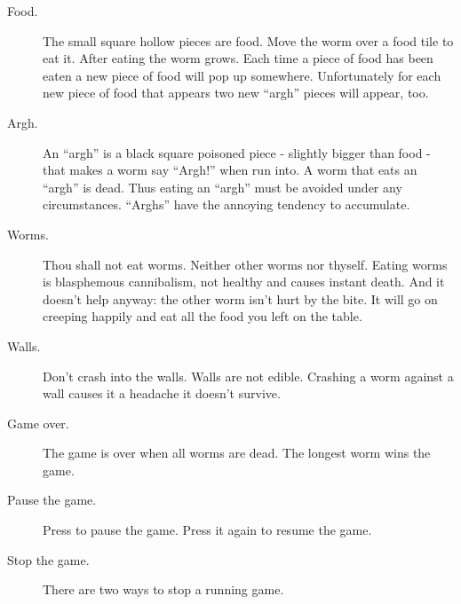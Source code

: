 \begin{description}
\item[Food.]
The small square hollow pieces are food. Move the worm over a food tile
to eat it. After eating the worm grows. Each time a piece of food has
been eaten a new piece of food will pop up somewhere. Unfortunately for
each new piece of food that appears two new ``argh'' pieces will
appear, too.
\item[Argh.]
An ``argh'' is a black square poisoned piece {}- slightly bigger than
food {}- that makes a worm say ``Argh!'' when
run into.  A worm that eats an ``argh'' is dead. Thus eating an
``argh'' must be avoided under any circumstances. ``Arghs'' have the
annoying tendency to accumulate. 
\item[Worms.]
Thou shall not eat worms. Neither other worms nor thyself. Eating worms
is blasphemous cannibalism, not healthy and causes instant
death. And it doesn't help anyway: the other worm
isn't hurt by the bite. It will go on creeping happily
and eat all the food you left on the table. 
\item[Walls.]
Don't crash into the walls. Walls are not edible.
Crashing a worm against a wall causes it a headache it
doesn't survive. 
\item[Game over.]
The game is over when all worms are dead. The longest worm wins the
game. 
\item [Pause the game.]
Press
%
%
to pause the game. Press it again to resume the game.

\item[Stop the game.]
There are two ways to stop a running game.


\end{description}
